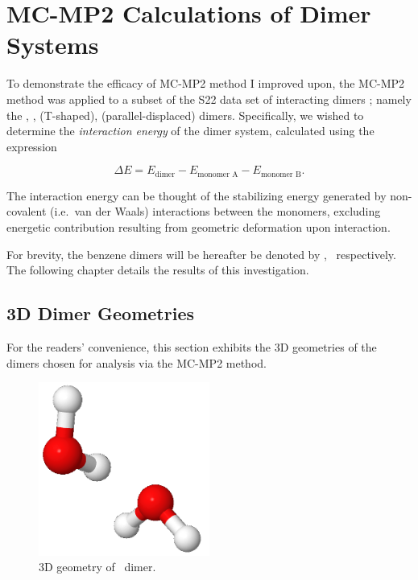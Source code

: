 \chapter{MC-MP2 Calculations of Dimer Systems}

To demonstrate the efficacy of MC-MP2 method I improved upon, the MC-MP2 method
was applied to a subset of the S22 data set of interacting dimers \cite{s22};
namely the \hho, \ch,  (T-shaped),  (parallel-displaced)
dimers. Specifically, we wished to determine the \emph{interaction energy} of
the dimer system, calculated using the expression

\begin{equation}
\Delta E = E_\text{dimer} - E_\text{monomer A} - E_\text{monomer B}.
\end{equation}

\noindent The interaction energy can be thought of the stabilizing energy
generated by non-covalent (i.e.\ van der Waals) interactions between the
monomers, excluding energetic contribution resulting from geometric deformation
upon interaction.

For brevity, the benzene dimers will be hereafter be denoted by \benzT,
\benzpara\ respectively. The following chapter details the results of this
investigation.

\section{3D Dimer Geometries}

For the readers' convenience, this section exhibits the 3D geometries of the
dimers chosen for analysis via the MC-MP2 method.

\begin{figure}[H]
\centering
\includegraphics[width = 0.5\textwidth]{figures/h2o.png}
\caption{3D geometry of \hho\ dimer.}
\end{figure}


